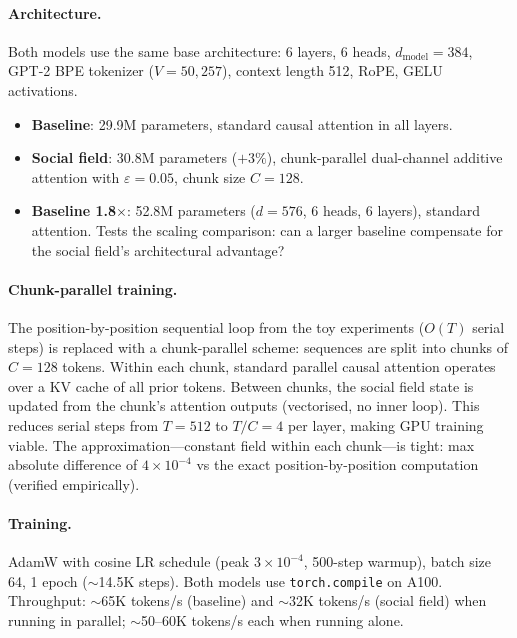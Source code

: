 \documentclass[11pt,a4paper]{article}
\begin{document}
\paragraph{Architecture.}
Both models use the same base architecture:
6 layers, 6 heads, $d_{\text{model}} = 384$, GPT-2 BPE tokenizer
($V = 50{,}257$), context length 512, RoPE, GELU activations.
\begin{itemize}
    \item \textbf{Baseline}: 29.9M parameters, standard causal
          attention in all layers.
    \item \textbf{Social field}: 30.8M parameters ($+3\%$),
          chunk-parallel dual-channel additive attention with
          $\varepsilon = 0.05$, chunk size $C = 128$.
    \item \textbf{Baseline 1.8$\times$}: 52.8M parameters
          ($d = 576$, 6 heads, 6 layers), standard attention.
          Tests the scaling comparison: can a larger baseline
          compensate for the social field's architectural advantage?
\end{itemize}

\paragraph{Chunk-parallel training.}
The position-by-position sequential loop from the toy experiments
($O(T)$ serial steps) is replaced with a chunk-parallel scheme:
sequences are split into chunks of $C = 128$ tokens.  Within each
chunk, standard parallel causal attention operates over a KV cache
of all prior tokens.  Between chunks, the social field state is
updated from the chunk's attention outputs (vectorised, no inner
loop).  This reduces serial steps from $T = 512$ to $T/C = 4$ per
layer, making GPU training viable.  The approximation---constant
field within each chunk---is tight: max absolute difference of
$4 \times 10^{-4}$ vs the exact position-by-position computation
(verified empirically).

\paragraph{Training.}
AdamW with cosine LR schedule (peak $3 \times 10^{-4}$, 500-step
warmup), batch size 64, 1 epoch ($\sim$14.5K steps).  Both models
use \texttt{torch.compile} on A100.  Throughput: $\sim$65K tokens/s
(baseline) and $\sim$32K tokens/s (social field) when running in
parallel; $\sim$50--60K tokens/s each when running alone.
\end{document}
